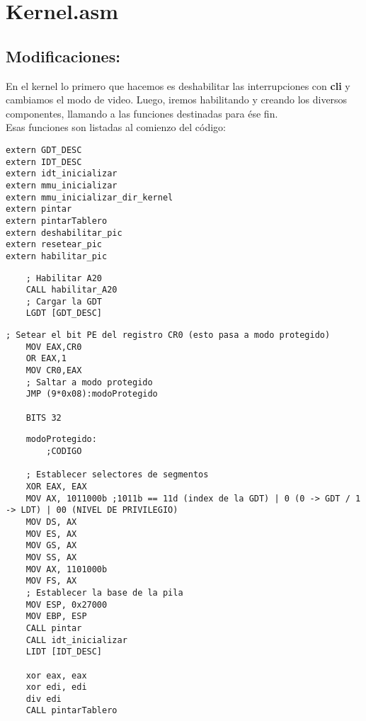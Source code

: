
\section{Kernel.asm}
\subsection{Modificaciones:}

En el kernel lo primero que hacemos es deshabilitar las interrupciones con \textbf{cli} y cambiamos el modo de video. 
Luego, iremos habilitando y creando los diversos componentes, llamando a las funciones destinadas para \'ese fin.
\\
Esas funciones son listadas al comienzo del c\'odigo:

\begin{codesnippet}
\begin{verbatim}
extern GDT_DESC
extern IDT_DESC 
extern idt_inicializar
extern mmu_inicializar
extern mmu_inicializar_dir_kernel
extern pintar
extern pintarTablero
extern deshabilitar_pic
extern resetear_pic
extern habilitar_pic
\end{verbatim}
\end{codesnippet}

\begin{codesnippet}
\begin{verbatim}
    ; Habilitar A20
    CALL habilitar_A20
    ; Cargar la GDT
    LGDT [GDT_DESC]
\end{verbatim}
\end{codesnippet}

\begin{codesnippet}
\begin{verbatim}
; Setear el bit PE del registro CR0 (esto pasa a modo protegido)
    MOV EAX,CR0
    OR EAX,1
    MOV CR0,EAX
    ; Saltar a modo protegido
    JMP (9*0x08):modoProtegido

    BITS 32
\end{verbatim}
\end{codesnippet}

\begin{codesnippet}
\begin{verbatim}
    modoProtegido:
        ;CODIGO
        
    ; Establecer selectores de segmentos
    XOR EAX, EAX
    MOV AX, 1011000b ;1011b == 11d (index de la GDT) | 0 (0 -> GDT / 1 -> LDT) | 00 (NIVEL DE PRIVILEGIO)
    MOV DS, AX
    MOV ES, AX
    MOV GS, AX
    MOV SS, AX
    MOV AX, 1101000b
    MOV FS, AX
    ; Establecer la base de la pila
    MOV ESP, 0x27000
    MOV EBP, ESP
    CALL pintar
    CALL idt_inicializar
	LIDT [IDT_DESC]

    xor eax, eax
    xor edi, edi
    div edi	
	CALL pintarTablero
\end{verbatim}
\end{codesnippet}

